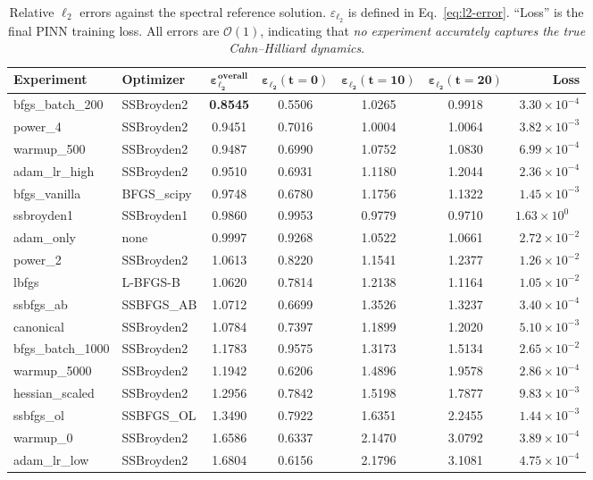 \documentclass[11pt,a4paper]{article}
\begin{document}
\begin{table}[ht]
\centering
\caption{Relative $\ell_2$ errors against the spectral reference
  solution.  $\varepsilon_{\ell_2}$ is defined in
  Eq.~\eqref{eq:l2-error}.  ``Loss'' is the final PINN training loss.
  All errors are $\mathcal{O}(1)$, indicating that \emph{no experiment
  accurately captures the true Cahn--Hilliard dynamics}.}
\label{tab:l2-errors}
\small
\begin{tabular}{@{}llccccr@{}}
\toprule
\textbf{Experiment} & \textbf{Optimizer} &
  $\bm{\varepsilon_{\ell_2}^{\text{overall}}}$ &
  $\bm{\varepsilon_{\ell_2}(t{=}0)}$ &
  $\bm{\varepsilon_{\ell_2}(t{=}10)}$ &
  $\bm{\varepsilon_{\ell_2}(t{=}20)}$ &
  \textbf{Loss} \\
\midrule
bfgs\_batch\_200        & SSBroyden2  & \textbf{0.8545} & 0.5506 & 1.0265 & 0.9918 & $3.30 \times 10^{-4}$ \\
power\_4                & SSBroyden2  & 0.9451 & 0.7016 & 1.0004 & 1.0064 & $3.82 \times 10^{-3}$ \\
warmup\_500             & SSBroyden2  & 0.9487 & 0.6990 & 1.0752 & 1.0830 & $6.99 \times 10^{-4}$ \\
adam\_lr\_high           & SSBroyden2  & 0.9510 & 0.6931 & 1.1180 & 1.2044 & $2.36 \times 10^{-4}$ \\
bfgs\_vanilla           & BFGS\_scipy & 0.9748 & 0.6780 & 1.1756 & 1.1322 & $1.45 \times 10^{-3}$ \\
ssbroyden1              & SSBroyden1  & 0.9860 & 0.9953 & 0.9779 & 0.9710 & $1.63 \times 10^{0\phantom{-}}$ \\
adam\_only               & none        & 0.9997 & 0.9268 & 1.0522 & 1.0661 & $2.72 \times 10^{-2}$ \\
power\_2                & SSBroyden2  & 1.0613 & 0.8220 & 1.1541 & 1.2377 & $1.26 \times 10^{-2}$ \\
lbfgs                   & L-BFGS-B    & 1.0620 & 0.7814 & 1.2138 & 1.1164 & $1.05 \times 10^{-2}$ \\
ssbfgs\_ab              & SSBFGS\_AB  & 1.0712 & 0.6699 & 1.3526 & 1.3237 & $3.40 \times 10^{-4}$ \\
canonical               & SSBroyden2  & 1.0784 & 0.7397 & 1.1899 & 1.2020 & $5.10 \times 10^{-3}$ \\
bfgs\_batch\_1000       & SSBroyden2  & 1.1783 & 0.9575 & 1.3173 & 1.5134 & $2.65 \times 10^{-2}$ \\
warmup\_5000            & SSBroyden2  & 1.1942 & 0.6206 & 1.4896 & 1.9578 & $2.86 \times 10^{-4}$ \\
hessian\_scaled         & SSBroyden2  & 1.2956 & 0.7842 & 1.5198 & 1.7877 & $9.83 \times 10^{-3}$ \\
ssbfgs\_ol              & SSBFGS\_OL  & 1.3490 & 0.7922 & 1.6351 & 2.2455 & $1.44 \times 10^{-3}$ \\
warmup\_0               & SSBroyden2  & 1.6586 & 0.6337 & 2.1470 & 3.0792 & $3.89 \times 10^{-4}$ \\
adam\_lr\_low            & SSBroyden2  & 1.6804 & 0.6156 & 2.1796 & 3.1081 & $4.75 \times 10^{-4}$ \\
\bottomrule
\end{tabular}
\end{table}
\end{document}
